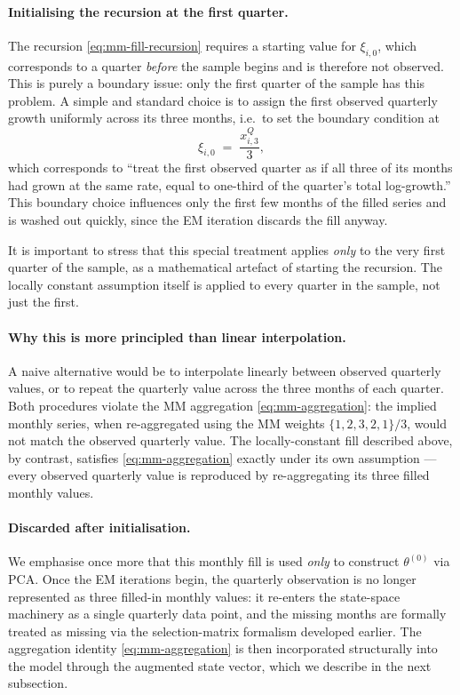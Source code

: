 \documentclass[11pt, a4paper, oneside]{article}
\begin{document}
\paragraph{Initialising the recursion at the first quarter.}
The recursion \eqref{eq:mm-fill-recursion} requires a starting
value for $\xi_{i, 0}$, which corresponds to a quarter \emph{before}
the sample begins and is therefore not observed. This is purely a
boundary issue: only the first quarter of the sample has this
problem. A simple and standard choice is to assign the first
observed quarterly growth uniformly across its three months, i.e.\
to set the boundary condition at
\[
\xi_{i, 0} \;=\; \frac{x^Q_{i, 3}}{3},
\]
which corresponds to ``treat the first observed quarter as if all
three of its months had grown at the same rate, equal to one-third
of the quarter's total log-growth.'' This boundary choice influences
only the first few months of the filled series and is washed out
quickly, since the EM iteration discards the fill anyway.

It is important to stress that this special treatment applies
\emph{only} to the very first quarter of the sample, as a
mathematical artefact of starting the recursion. The locally
constant assumption itself is applied to every quarter in the
sample, not just the first.

\paragraph{Why this is more principled than linear interpolation.}
A naive alternative would be to interpolate linearly between
observed quarterly values, or to repeat the quarterly value across
the three months of each quarter. Both procedures violate the MM
aggregation \eqref{eq:mm-aggregation}: the implied monthly series,
when re-aggregated using the MM weights $\{1, 2, 3, 2, 1\}/3$, would
not match the observed quarterly value. The locally-constant fill
described above, by contrast, satisfies \eqref{eq:mm-aggregation}
exactly under its own assumption — every observed quarterly value
is reproduced by re-aggregating its three filled monthly values.

\paragraph{Discarded after initialisation.}
We emphasise once more that this monthly fill is used \emph{only} to
construct $\theta^{(0)}$ via PCA. Once the EM iterations begin, the
quarterly observation is no longer represented as three filled-in
monthly values: it re-enters the state-space machinery as a single
quarterly data point, and the missing months are formally treated as
missing via the selection-matrix formalism developed earlier. The
aggregation identity \eqref{eq:mm-aggregation} is then incorporated
structurally into the model through the augmented state vector,
which we describe in the next subsection.
\end{document}
